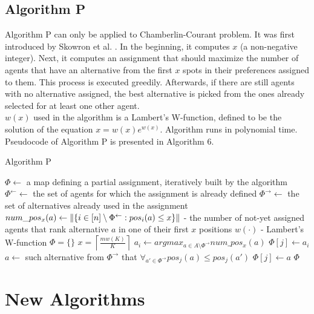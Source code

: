 \subsection{Algorithm P}

Algorithm P can only be applied to Chamberlin-Courant problem. It was first introduced by Skowron et al. \cite{1}. In the beginning, it computes $x$ (a non-negative integer). Next, it computes an assignment that should maximize the number of agents that have an alternative from the first $x$ spots in their preferences assigned to them. This process is executed greedily. Afterwards, if there are still agents with no alternative assigned, the best alternative is picked from the ones already selected for at least one other agent.
\\

$w(x)$ used in the algorithm is a Lambert's W-function, defined to be the solution of the equation $x = w(x)e^{w(x)}$. Algorithm runs in polynomial time. Pseudocode of Algorithm P is presented in Algorithm 6.

\begin{algorithm}
\caption{Algorithm P}\label{euclid}
\begin{algorithmic}[1]
		\State $\Phi \gets$ a map defining a partial assignment, iteratively built by the algorithm
		\State $\Phi^{\leftarrow} \gets$ the set of agents for which the assignment is already defined
		\State $\Phi^{\rightarrow} \gets$ the set of alternatives already used in the assignment
		\State $num\_pos_{x}(a) \gets \lVert\left\{ i \in [n] \setminus \Phi^{\leftarrow} : pos_{i}(a) \leq x \right\}\rVert$ - the number of not-yet assigned agents that rank alternative $a$ in one of their first $x$ positions
		\State $w(\cdot)$ - Lambert's W-function
		\State $\Phi = \{\}$
		\State $x = \left\lceil \frac{mw(K)}{K} \right\rceil$
			\State $a_{i} \gets argmax_{a \in A \setminus \Phi^{\rightarrow}} num\_pos_{x}(a)$
					\State $\Phi[j] \gets a_{i}$
				\EndIf
			\EndFor
		\EndFor
			\State $a \gets$ such alternative from $\Phi^{\rightarrow}$ that $\forall_{a' \in \Phi^{\rightarrow}} pos_{j}(a) \leq pos_{j}(a')$
			\State $\Phi[j] \gets a$
		\EndFor
		\State \Return $\Phi$
	\EndProcedure
\end{algorithmic}
\end{algorithm}

\section{New Algorithms}

